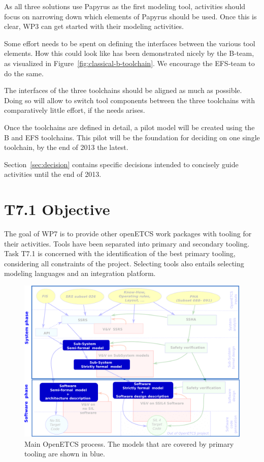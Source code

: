 As all three solutions use Papyrus as the first modeling tool, activities should focus on narrowing down which elements of Papyrus should be used.  Once this is clear, WP3 can get started with their modeling activities.

Some effort needs to be spent on defining the interfaces between the various tool elements.  How this could look like has been demonstrated nicely by the B-team, as visualized in Figure~\ref{fig:classical-b-toolchain}.  We encourage the EFS-team to do the same.

The interfaces of the three toolchains should be aligned as much as possible.  Doing so will allow to switch tool components between the three toolchains with comparatively little effort, if the needs arises.

Once the toolchains are defined in detail, a pilot model will be created using the B and EFS toolchains.  This pilot will be the foundation for deciding on one single toolchain, by the end of 2013 the latest.

Section~\ref{sec:decision} contains specific decisions intended to concisely guide activities until the end of 2013.

\section{T7.1 Objective}

The goal of WP7 is to provide other openETCS work packages with tooling for their activities.  Tools have been separated into primary and secondary tooling.  Task T7.1 is concerned with the identification of the best primary tooling, considering all constraints of the project.  Selecting tools also entails selecting modeling languages and an integration platform.

 \begin{figure}[b!]
  \centering
  \includegraphics[scale=0.45]{images/WholeProcess.png}
  \caption{Main OpenETCS process.  The models that are covered by primary tooling are shown in blue.}
  \label{fig:main_process}
\end{figure}


